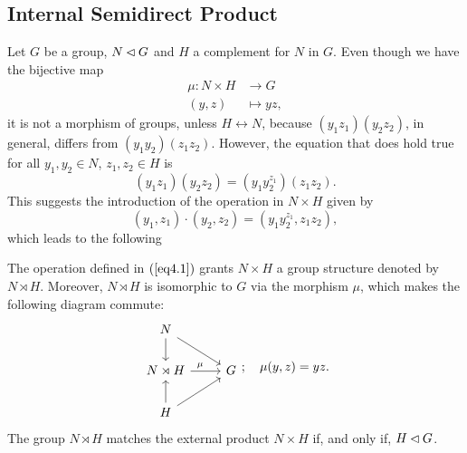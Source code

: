 \subsection*{Internal Semidirect Product} Let $G$ be a group, $N\lhd G$ and $H$ a complement for $N$ in $G$. Even though we have the bijective map
\begin{align*}
    \mu\colon N\times H&\to G\\
    (y,z)&\mapsto yz,
\end{align*}
it is not a morphism of groups, unless $H\leftrightarrow N$, because $(y_1z_1)(y_2z_2)$, in general, differs from $(y_1y_2)(z_1z_2)$. However, the equation that does hold true for all $y_1,y_2\in N$, $z_1,z_2\in H$ is
\begin{equation}\label{eq4}
    (y_1z_1)(y_2z_2) = (y_1y_2^{z_1})(z_1z_2).
\end{equation}
This suggests the introduction of the operation in $N\times H$ given by
\begin{equation}\label{eq4.1}
    (y_1,z_1)\cdot(y_2,z_2) = (y_1y_2^{z_1},z_1z_2),
\end{equation}
which leads to the following
\begin{thm}\label{internal-semidirect-product}
    The operation defined in\/ $(\ref{eq4.1})$ grants\/ $N\times H$ a group structure denoted by $N\rtimes H$. Moreover, $N\rtimes H$ is isomorphic to\/ $G$ via the morphism $\mu$, which makes the following diagram commute:
    $$
    \begin{tikzcd}
        N\arrow[rd]\arrow[d]\\
        N\rtimes H\arrow[r, "\hspace{-0.3cm}\mu"]&G\\
        H\arrow[ru]\arrow[u]
    \end{tikzcd};\quad\mu(y,z)=yz.
    $$
    The group $N\rtimes H$ matches the external product $N\times H$ if, and only if, $H\lhd G$.
\end{thm}

